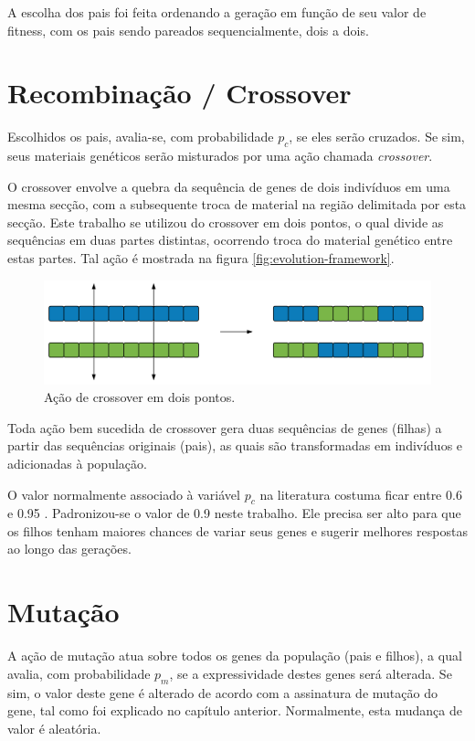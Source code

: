 A escolha dos pais foi feita ordenando a geração em função de seu valor de fitness, com os pais sendo pareados sequencialmente, dois a dois.

\section{Recombinação / Crossover}

Escolhidos os pais, avalia-se, com probabilidade $p_c$, se eles serão cruzados. Se sim, seus materiais genéticos serão misturados por uma ação chamada \emph{crossover}.

O crossover envolve a quebra da sequência de genes de dois indivíduos em uma mesma secção, com a subsequente troca de material na região delimitada por esta secção. Este trabalho se utilizou do crossover em dois pontos, o qual divide as sequências em duas partes distintas, ocorrendo troca do material genético entre estas partes. Tal ação é mostrada na figura \ref{fig:evolution-framework}.

\begin{figure}[ht!]
    \centering \includegraphics[width=1.0\textwidth]{crossover.png}
    \caption{Ação de crossover em dois pontos.}
    \label{fig:crossover}
\end{figure}

Toda ação bem sucedida de crossover gera duas sequências de genes (filhas) a partir das sequências originais (pais), as quais são transformadas em indivíduos e adicionadas à população.

O valor normalmente associado à variável $p_c$ na literatura costuma ficar entre 0.6 e 0.95 \cite{dejong1975analysis, eiben2011parameter, obitkopc}. Padronizou-se o valor de 0.9 neste trabalho. Ele precisa ser alto para que os filhos tenham maiores chances de variar seus genes e sugerir melhores respostas ao longo das gerações.

\section{Mutação}

A ação de mutação atua sobre todos os genes da população (pais e filhos), a qual avalia, com probabilidade $p_m$, se a expressividade destes genes será alterada. Se sim, o valor deste gene é alterado de acordo com a assinatura de mutação do gene, tal como foi explicado no capítulo anterior. Normalmente, esta mudança de valor é aleatória.

